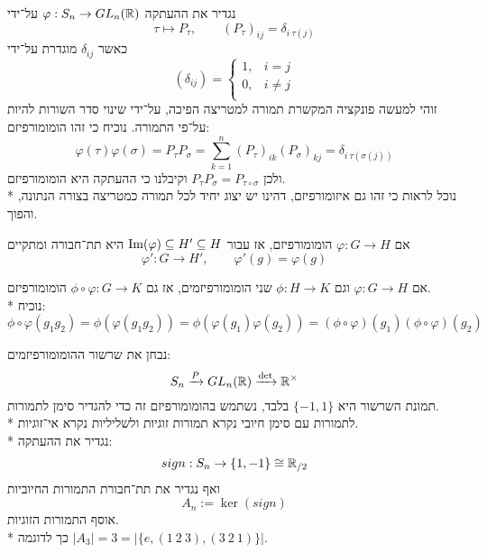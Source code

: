 \begin{example}
	נגדיר את ההעתקה $\varphi : S_n \to GL_n(\mathbb{R})$ על־ידי
	\[
		\tau \mapsto P_\tau,
		\qquad
		{(P_\tau)}_{ij} = \delta_{i\ \tau(j)}
	\]
	כאשר $\delta_{ij}$ מוגדרת על־ידי
	\[
		(\delta_{ij}) = \begin{cases}
			1, & i = j \\
			0, & i \ne j \\
		\end{cases}
	\]
	זוהי למעשה פונקציה המקשרת תמורה למטריצה הפיכה, על־ידי שינוי סדר השורות להיות על־פי התמורה. נוכיח כי זהו הומומורפיזם:
	\[
		\varphi(\tau)\varphi(\sigma)
		= P_\tau P_\sigma
		= \sum_{k = 1}^{n} {(P_\tau)}_{ik} {(P_\sigma)}_{kj}
		= \delta_{i\ \tau(\sigma(j))}
	\]
	ולכן $P_\tau P_\sigma = P_{\tau \circ \sigma}$ וקיבלנו כי ההעתקה היא הומומורפיזם. \\*
	נוכל לראות כי זהו גם איזומורפיזם, דהינו יש יצוג יחיד לכל תמורה כמטריצה בצורה הנתונה, והפוך.
\end{example}
\begin{example}
	אם $\varphi : G \to H$ הומומורפיזם, אז עבור $\operatorname{Im}(\varphi) \subseteq H' \subseteq H$ היא תת־חבורה ומתקיים
	\[
		\varphi' : G \to H',
		\qquad
		\varphi'(g) = \varphi(g)
	\]
\end{example}
\begin{example}
	אם $\varphi : G \to H$ וגם $\phi : H \to K$ שני הומומורפיזמים, אז גם $\phi \circ \varphi : G \to K$ הומומורפיזם. \\*
	נוכיח:
	\[
		\phi \circ \varphi(g_1 g_2) = \phi(\varphi(g_1 g_2)) = \phi(\varphi(g_1) \varphi(g_2)) = (\phi \circ \varphi)(g_1) (\phi \circ \varphi)(g_2)
	\]
\end{example}
\begin{example}
	נבחן את שרשור ההומומורפיזמים:
	\[
		S_n \xrightarrow{P} GL_n(\mathbb{R}) \xrightarrow{\det} \mathbb{R}^\times
	\]
	תמונת השרשור היא $\{ -1, 1 \}$ בלבד, נשתמש בהומומורפיזם זה כדי להגדיר סימן לתמורות. \\*
	לתמורות עם סימן חיובי נקרא תמורות זוגיות ולשליליות נקרא אי־זוגיות. \\*
	נגדיר את ההעתקה:
	\[
		sign : S_n \to \{1, -1\} \cong \mathbb{R}_{/2}
	\]
	ואף נגדיר את תת־חבורת התמורות החיוביות
	\[
		A_n := \ker(sign)
	\]
	אוסף התמורות הזוגיות. \\*
	כך לדוגמה $|A_3| = 3 = |\{e, (1\ 2\ 3), (3\ 2\ 1)\}|$.
\end{example}
